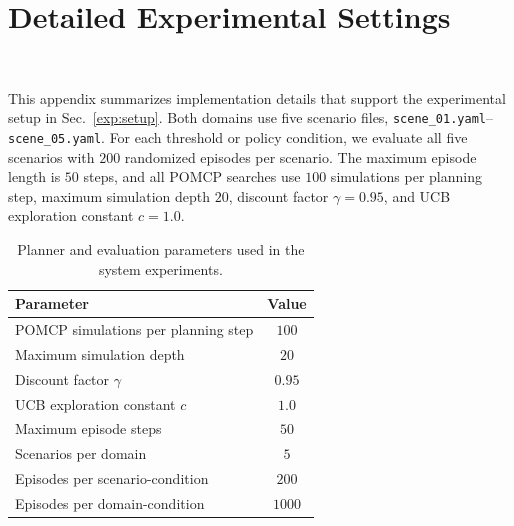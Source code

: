 \section{Detailed Experimental Settings}~\label{appx:settings}

This appendix summarizes implementation details that support the experimental setup in Sec.~\ref{exp:setup}. Both domains use five scenario files, \texttt{scene\_01.yaml}--\texttt{scene\_05.yaml}. For each threshold or policy condition, we evaluate all five scenarios with $200$ randomized episodes per scenario. The maximum episode length is $50$ steps, and all POMCP searches use $100$ simulations per planning step, maximum simulation depth $20$, discount factor $\gamma=0.95$, and UCB exploration constant $c=1.0$.

\begin{table}[h]
\centering
\caption{Planner and evaluation parameters used in the system experiments.}
\label{tab:app_planner_params}
\small
\begin{tabular}{lc}
\toprule
\textbf{Parameter} & \textbf{Value} \\
\midrule
POMCP simulations per planning step & $100$ \\
Maximum simulation depth & $20$ \\
Discount factor $\gamma$ & $0.95$ \\
UCB exploration constant $c$ & $1.0$ \\
Maximum episode steps & $50$ \\
Scenarios per domain & $5$ \\
Episodes per scenario-condition & $200$ \\
Episodes per domain-condition & $1000$ \\
\bottomrule
\end{tabular}
\end{table}

